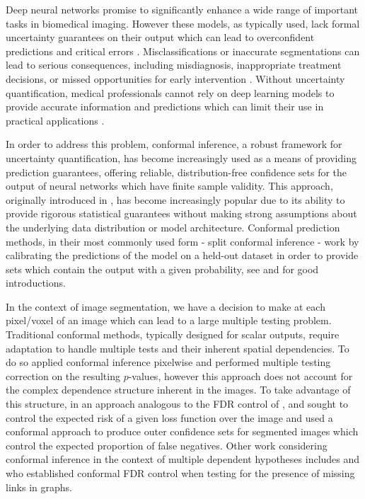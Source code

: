 


Deep neural networks promise to significantly enhance a wide range of important tasks in biomedical imaging. However these models, as typically used, lack formal uncertainty guarantees on their output which can lead to overconfident predictions and critical errors \citep{Guo2017, Gupta2020}. Misclassifications or inaccurate segmentations can lead to serious consequences, including misdiagnosis, inappropriate treatment decisions, or missed opportunities for early intervention \citep{Topol2019}. Without uncertainty quantification, medical professionals cannot rely on deep learning models to provide accurate information and predictions which can limit their use in practical applications \citep{Jungo2020}. 

In order to address this problem, conformal inference, a robust framework for uncertainty quantification, has become increasingly used as a means of providing prediction guarantees, offering reliable, distribution-free confidence sets for the output of neural networks which have finite sample validity. This approach, originally introduced in \cite{Papadopoulos2002, Vovk2005}, has become increasingly popular due to its ability to provide rigorous statistical guarantees without making strong assumptions about the underlying data distribution or model architecture. Conformal prediction methods, in their most commonly used form - split conformal inference - work by calibrating the predictions of the model on a held-out dataset in order to provide sets which contain the output with a given probability, see \cite{Shafer2008} and \cite{Angelopoulos2021} for good introductions.

In the context of image segmentation, we have a decision to make at each pixel/voxel of an image which can lead to a large multiple testing problem. Traditional conformal methods, typically designed for scalar outputs, require adaptation to handle multiple tests and their inherent spatial dependencies. To do so \cite{Angelopoulos2021LTT} applied conformal inference pixelwise and performed multiple testing correction on the resulting $p$-values, however this approach does not account for the complex dependence structure inherent in the images. To take advantage of this structure, in an approach analogous to the FDR control of \citep{Benjamini1995}, \cite{Bates2021} and \cite{Angelopoulos2022} sought to control the expected risk of a given loss function over the image and used a conformal approach to produce outer confidence sets for segmented images which control the expected proportion of false negatives. Other work considering conformal inference in the context of multiple dependent hypotheses includes \cite{Marandon2024} and \cite{Blanchard2024} who established conformal FDR control when testing for the presence of missing links in graphs.

